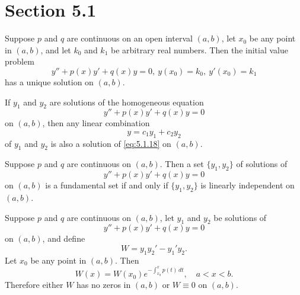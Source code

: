 \section*{Section 5.1}
{}
\setcounter{chapter}{5}
\setcounter{section}{1}

\setcounter{theorem}{0}
\begin{theorem}
  \label{thmtype:5.1.1} Suppose $p$ and $q$ are continuous on an open interval $(a,b)$, let $x_{0}$
  be any point in $(a,b)$, and let $k_{0}$ and $k_{1}$ be arbitrary real numbers. Then the initial
  value problem
  \[
    y''+p(x)y'+q(x)y=0,\ y(x_{0})=k_{0},\ y'(x_{0})=k_{1}
  \]
  has a unique solution on $(a,b)$.
\end{theorem}

\setcounter{theorem}{1}
\setcounter{equation}{17}
\begin{theorem}
  \label{thmtype:5.1.2} If $y_{1}$ and $y_{2}$ are solutions of the homogeneous equation
  \begin{equation}
    \label{eq:5.1.18}y''+p(x)y'+q(x)y=0
  \end{equation}
  on $(a,b)$, then any linear combination
  \begin{equation}
    \label{eq:5.1.19}y=c_{1}y_{1}+c_{2}y_{2}
  \end{equation}
  of $y_{1}$ and $y_{2}$ is also a solution of \eqref{eq:5.1.18} on $(a,b)$.
\end{theorem}

\setcounter{theorem}{2}
\setcounter{equation}{19}
\begin{theorem}
  \label{thmtype:5.1.3} Suppose $p$ and $q$ are continuous on $(a,b)$. Then a set $\{y_{1},y_{2}\}$
  of solutions of
  \begin{equation}
    \label{eq:5.1.20}y''+p(x)y'+q(x)y=0
  \end{equation}
  on $(a,b)$ is a fundamental set if and only if $\{y_{1},y_{2}\}$ is linearly independent on
  $(a,b)$.
\end{theorem}

\setcounter{theorem}{3}
\setcounter{equation}{26}
\begin{theorem}
  \label{thmtype:5.1.4} Suppose $p$ and $q$ are continuous on $(a,b)$, let $y_{1}$ and $y_{2}$ be
  solutions of
  \begin{equation}
    \label{eq:5.1.27}y''+p(x)y'+q(x)y=0
  \end{equation}
  on $(a,b)$, and define
  \begin{equation}
    \label{eq:5.1.28}W=y_{1}y_{2}'-y_{1}'y_{2}.
  \end{equation}
  Let $x_{0}$ be any point in $(a,b)$. Then
  \begin{equation}
    \label{eq:5.1.29}W(x)=W(x_{0})e^{-\int^{x}_{x_{0}}p(t)\, dt},\quad a<x<b.
  \end{equation}
  Therefore either $W$ has no zeros in $(a,b)$ or $W\equiv0$ on $(a,b)$.
\end{theorem}

